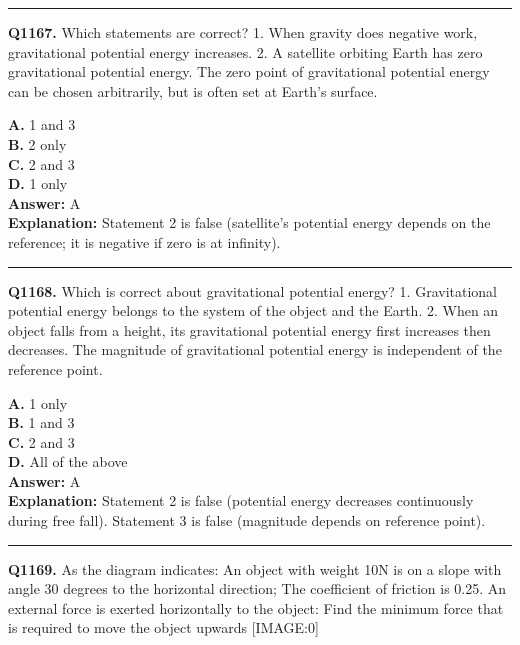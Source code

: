 \documentclass[12pt]{article}
\begin{document}
\hrule
\vspace{1em}


\noindent
\textbf{Q1167.} Which statements are correct?
1.
When gravity does negative work, gravitational potential energy increases.
2.
A satellite orbiting Earth has zero gravitational potential energy.
The zero point of gravitational potential energy can be chosen arbitrarily, but is often set at Earth’s surface.



\textbf{A.} 1 and 3 \\
\textbf{B.} 2 only \\
\textbf{C.} 2 and 3 \\
\textbf{D.} 1 only \\

\textbf{Answer:} A \\
\textbf{Explanation:} Statement 2 is false (satellite’s potential energy depends on the reference; it is negative if zero is at infinity).

\hrule
\vspace{1em}


\noindent
\textbf{Q1168.} Which is correct about gravitational potential energy?
1.
Gravitational potential energy belongs to the system of the object and the Earth.
2.
When an object falls from a height, its gravitational potential energy first increases then decreases.
The magnitude of gravitational potential energy is independent of the reference point.



\textbf{A.} 1 only \\
\textbf{B.} 1 and 3 \\
\textbf{C.} 2 and 3 \\
\textbf{D.} All of the above \\

\textbf{Answer:} A \\
\textbf{Explanation:} Statement 2 is false (potential energy decreases continuously during free fall). Statement 3 is false (magnitude depends on reference point).

\hrule
\vspace{1em}


\noindent
\textbf{Q1169.} As the diagram indicates: An object with weight 10N is on a slope with angle 30 degrees to the horizontal direction; The coefficient of friction is 0.25. An external force is exerted horizontally to the object: Find the minimum force that is required to move the object upwards
[IMAGE:0]
\end{document}

